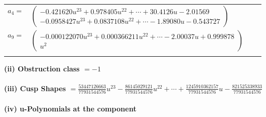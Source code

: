 \documentclass[1p]{elsarticle_modified}
\theoremstyle{definition}
\begin{document}
\begin{tabular}{m{7pt} m{180pt} m{7pt} m{180pt} }
\flushright $a_{4}=$&$\begin{pmatrix}-0.421620 u^{23}+0.978405 u^{22}+\cdots+30.4126 u-2.01569\\-0.0958427 u^{23}+0.0837108 u^{22}+\cdots-1.89080 u-0.543727\end{pmatrix}$ \\
\flushright $a_{9}=$&$\begin{pmatrix}-0.000122070 u^{23}+0.000366211 u^{22}+\cdots-2.00037 u+0.999878\\u^2\end{pmatrix}$\\&\end{tabular}
\flushleft \textbf{(ii) Obstruction class $= -1$}\\~\\
\flushleft \textbf{(iii) Cusp Shapes $= \frac{53447126663}{77931544576} u^{23}-\frac{86145029121}{77931544576} u^{22}+\cdots+\frac{1245910362157}{77931544576} u-\frac{821525338933}{77931544576}$}\\~\\
\newpage\renewcommand{\arraystretch}{1}
\flushleft \textbf{(iv) u-Polynomials at the component}\newline \\
\end{document}
